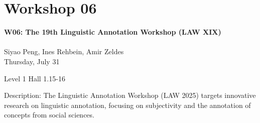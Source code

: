 \clearpage


\section[W06: The 19th Linguistic Annotation Workshop (LAW XIX)]{Workshop 06}
\label{workshop_6}

\begin{center}
    {\Large \textbf{W06: The 19th Linguistic Annotation Workshop (LAW XIX)}}\\
\\

    Siyao Peng, Ines Rehbein, Amir Zeldes\\

    Thursday, July 31
    
   Level 1 Hall 1.15-16

\end{center}

Description: The Linguistic Annotation Workshop (LAW 2025) targets innovative research on linguistic annotation, focusing on subjectivity and the annotation of concepts from social sciences.

